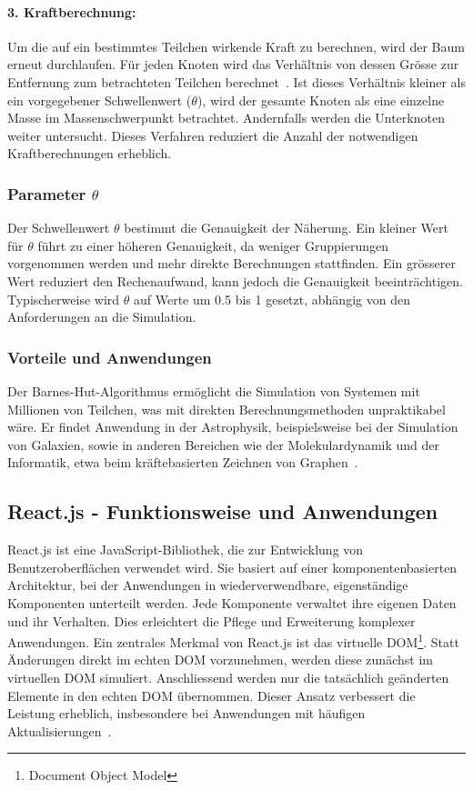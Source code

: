 \documentclass[a4paper,12pt,twoside]{article}
\begin{document}
\paragraph{3. Kraftberechnung:}
Um die auf ein bestimmtes Teilchen wirkende Kraft zu berechnen, wird der Baum erneut durchlaufen. Für jeden Knoten wird das Verhältnis von dessen Grösse zur Entfernung zum betrachteten Teilchen berechnet~\cite{BarnesHutBeltoforion}. Ist dieses Verhältnis kleiner als ein vorgegebener Schwellenwert ($\theta$), wird der gesamte Knoten als eine einzelne Masse im Massenschwerpunkt betrachtet. Andernfalls werden die Unterknoten weiter untersucht. Dieses Verfahren reduziert die Anzahl der notwendigen Kraftberechnungen erheblich.

\subsubsection{Parameter $\theta$}
Der Schwellenwert $\theta$ bestimmt die Genauigkeit der Näherung. Ein kleiner Wert für $\theta$ führt zu einer höheren Genauigkeit, da weniger Gruppierungen vorgenommen werden und mehr direkte Berechnungen stattfinden. Ein grösserer Wert reduziert den Rechenaufwand, kann jedoch die Genauigkeit beeinträchtigen. Typischerweise wird $\theta$ auf Werte um 0.5 bis 1 gesetzt, abhängig von den Anforderungen an die Simulation.

\subsubsection{Vorteile und Anwendungen}
Der Barnes-Hut-Algorithmus ermöglicht die Simulation von Systemen mit Millionen von Teilchen, was mit direkten Berechnungsmethoden unpraktikabel wäre. Er findet Anwendung in der Astrophysik, beispielsweise bei der Simulation von Galaxien, sowie in anderen Bereichen wie der Molekulardynamik und der Informatik, etwa beim kräftebasierten Zeichnen von Graphen~\cite{Heer2017}.

\subsection{React.js - Funktionsweise und Anwendungen}

React.js ist eine JavaScript-Bibliothek, die zur Entwicklung 
von Benutzeroberflächen verwendet wird. 
Sie basiert auf einer komponentenbasierten Architektur, 
bei der Anwendungen in wiederverwendbare, eigenständige 
Komponenten unterteilt werden. 
Jede Komponente verwaltet ihre eigenen Daten und ihr Verhalten. 
Dies erleichtert die Pflege und Erweiterung komplexer Anwendungen. 
Ein zentrales Merkmal von React.js ist das virtuelle 
DOM\footnote{Document Object Model}. Statt Änderungen 
direkt im echten DOM vorzunehmen, werden diese zunächst im virtuellen DOM simuliert. 
Anschliessend werden nur die tatsächlich geänderten Elemente in den echten DOM übernommen. 
Dieser Ansatz verbessert die Leistung erheblich, insbesondere bei Anwendungen 
mit häufigen Aktualisierungen~\cite{ReactJSTutorial}.
\end{document}

